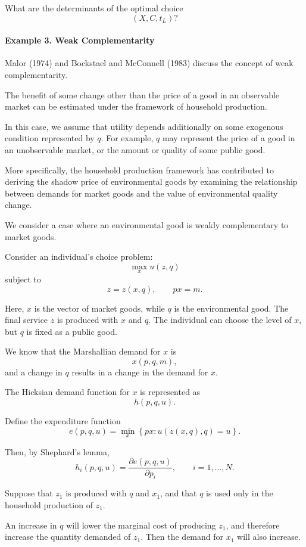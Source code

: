 What are the determinants of the optimal choice
\[
(X,C,t_L)?
\]



\paragraph{Example 3. Weak Complementarity}

Malor (1974) and Bockstael and McConnell (1983) discuss the concept of weak complementarity.

The benefit of some change other than the price of a good in an observable market can be estimated under the framework of household production.

In this case, we assume that utility depends additionally on some exogenous condition represented by \(q\). For example, \(q\) may represent the price of a good in an unobservable market, or the amount or quality of some public good.

More specifically, the household production framework has contributed to deriving the shadow price of environmental goods by examining the relationship between demands for market goods and the value of environmental quality change.

We consider a case where an environmental good is weakly complementary to market goods.

Consider an individual's choice problem:
\[
\max_x u(z,q)
\]
subject to
\[
z=z(x,q),
\qquad
px=m.
\]

Here, \(x\) is the vector of market goods, while \(q\) is the environmental good. The final service \(z\) is produced with \(x\) and \(q\). The individual can choose the level of \(x\), but \(q\) is fixed as a public good.

We know that the Marshallian demand for \(x\) is
\[
x(p,q,m),
\]
and a change in \(q\) results in a change in the demand for \(x\).

The Hicksian demand function for \(x\) is represented as
\[
h(p,q,u).
\]

Define the expenditure function
\[
e(p,q,u)
=
\min_x
\left\{
px
:
u(z(x,q),q)=u
\right\}.
\]

Then, by Shephard's lemma,
\[
h_i(p,q,u)
=
\frac{\partial e(p,q,u)}{\partial p_i},
\qquad
i=1,\dots,N.
\]

Suppose that \(z_1\) is produced with \(q\) and \(x_1\), and that \(q\) is used only in the household production of \(z_1\).

An increase in \(q\) will lower the marginal cost of producing \(z_1\), and therefore increase the quantity demanded of \(z_1\). Then the demand for \(x_1\) will also increase.

